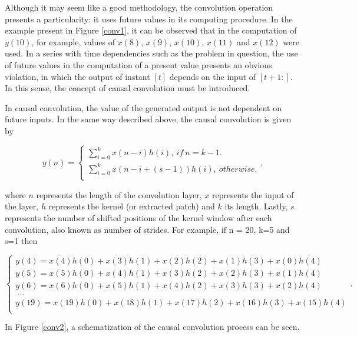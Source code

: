 Although it may seem like a good methodology, the convolution operation presents a particularity: it uses future values in its computing procedure. In the example present in Figure \ref{conv1}, it can be observed that in the computation of $y(10)$, for example, values of $x(8)$, $x(9)$, $x(10)$, $x(11)$ and $x(12)$ were used. In a series with time dependencies such as the problem in question, the use of future values in the computation of a present value presents an obvious violation, in which the output of instant $[t]$ depends on the input of $[t+1:]$. In this sense, the concept of causal convolution must be introduced. 

In causal convolution, the value of the generated output is not dependent on future inputs. In the same way described above, the causal convolution is given by 

\begin{equation}
y(n)=
    \begin{cases} 
            
        \sum_{i=0}^k x(n-i)h(i),\  if \  n=k-1.\\
        \sum_{i=0}^k x(n-i+(s-1))h(i),\  otherwise.\\
    
    \end{cases} ,
\end{equation}

where $n$ represents the length of the convolution layer, $x$ represents the input of the layer, $h$ represents the kernel (or extracted patch) and $k$ its length. Lastly, $s$ represents the number of shifted positions of the kernel window after each convolution, also known as number of strides. For example, if n = 20, k=5 and s=1 then

\begin{equation}
    \begin{cases} 
        y(4)=x(4)h(0)+x(3)h(1)+x(2)h(2)+x(1)h(3)+x(0)h(4)\\
        y(5)=x(5)h(0)+x(4)h(1)+x(3)h(2)+x(2)h(3)+x(1)h(4)\\
        y(6)=x(6)h(0)+x(5)h(1)+x(4)h(2)+x(3)h(3)+x(2)h(4)\\
        \  ...\\
        y(19)=x(19)h(0)+x(18)h(1)+x(17)h(2)+x(16)h(3)+x(15)h(4)\\
    \end{cases} .
    \label{noncausal}
\end{equation}

In Figure \ref{conv2}, a schematization of the causal convolution process can be seen.

